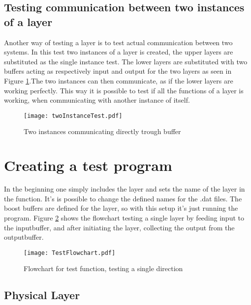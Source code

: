 \subsection{Testing communication between two instances of a layer}

Another way of testing a layer is to test actual communication between two systems. In this test two instances of a layer is created, the upper layers are substituted as the single instance test. The lower layers are substituted with two buffers acting as respectively  input and output for the two layers as seen in Figure \ref{fig:twoInstanceTest}.The two instances can then communicate, as if the lower layers are working perfectly. This way it is possible to test if all the functions of a layer is working, when communicating with another instance of itself.




\begin{figure}[htb]
	\begin{center}
	\texttt{[image: twoInstanceTest.pdf]}%
	\caption{Two instances communicating directly trough buffer}
	\label{fig:twoInstanceTest}	
	\end{center}
\end{figure}



\section{Creating a test program}
In the beginning one simply includes the layer and sets the name of the layer in the function. It's is possible to change the defined names for the .dat files. The boost buffers are defined for the layer, so with this setup it's just running the program.
Figure \ref{fig:TestFlowchart} shows the flowchart testing a single layer by feeding input to the inputbuffer, and after initiating the layer, collecting the output from the outputbuffer. 


\begin{figure}[htb]
	\begin{center}
	\texttt{[image: TestFlowchart.pdf]}
	\caption{Flowchart for test function, testing a single direction}
	\label{fig:TestFlowchart}	
	\end{center}
\end{figure}

\subsection{Physical Layer}

